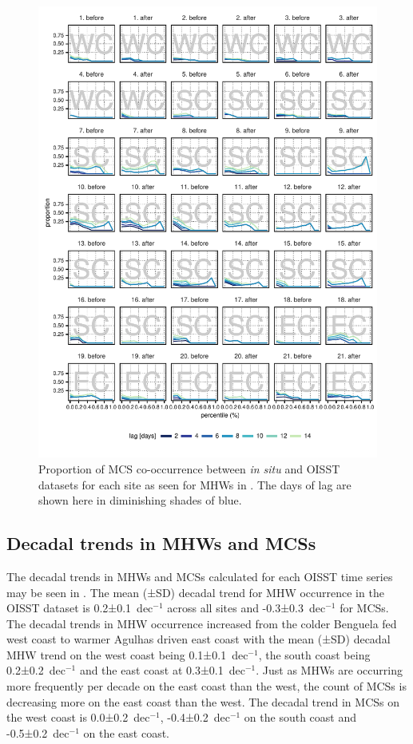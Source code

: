 \documentclass[a4paper,10pt,review]{elsarticle}
\begin{document}
\begin{figure}
\includegraphics[width=1.0\textwidth]{figure5.pdf}
\caption{Proportion of MCS co-occurrence between \emph{in situ} and OISST datasets for each site as seen for MHWs in . The days of lag are shown here in diminishing shades of blue.}
\label{fig:Figure5}
\end{figure}

\subsection{Decadal trends in MHWs and MCSs}
The decadal trends in MHWs and MCSs calculated for each OISST time series may be seen in . The mean (±SD) decadal trend for MHW occurrence in the OISST dataset is 0.2±0.1~dec$^{-1}$ across all sites and -0.3±0.3~dec$^{-1}$ for MCSs. The decadal trends in MHW occurrence increased from the colder Benguela fed west coast to warmer Agulhas driven east coast with the mean (±SD) decadal MHW trend on the west coast being 0.1±0.1~dec$^{-1}$, the south coast being 0.2±0.2~dec$^{-1}$ and the east coast at 0.3±0.1~dec$^{-1}$. Just as MHWs are occurring more frequently per decade on the east coast than the west, the count of MCSs is decreasing more on the east coast than the west. The decadal trend in MCSs on the west coast is 0.0±0.2~dec$^{-1}$, -0.4±0.2~dec$^{-1}$ on the south coast and -0.5±0.2~dec$^{-1}$ on the east coast.
\end{document}
